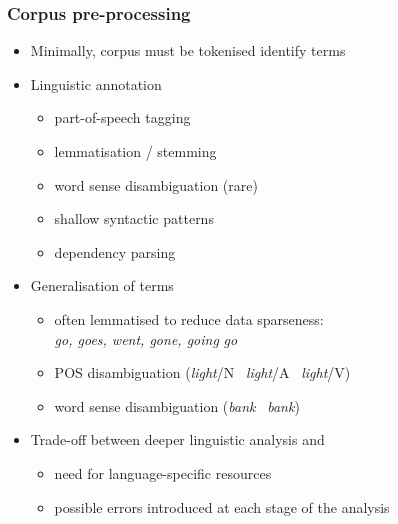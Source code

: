 \begin{frame}
  \frametitle{Corpus pre-processing}

  \ungap
  \begin{itemize}
  \item Minimally, corpus must be tokenised \so identify terms
  \item Linguistic annotation
    \begin{itemize}
    \item part-of-speech tagging
    \item lemmatisation / stemming
    \item word sense disambiguation (rare)
    \item shallow syntactic patterns
    \item dependency parsing
    \end{itemize}
    \pause
  \item Generalisation of terms
    \begin{itemize}
    \item often lemmatised to reduce data sparseness:\\
      \emph{go, goes, went, gone, going} \so \emph{go}
    \item POS disambiguation (\emph{light}/N \vs\ \emph{light}/A \vs\ \emph{light}/V)
    \item word sense disambiguation (\emph{bank} \vs\ \emph{bank})
    \end{itemize}
  \pause
  \item Trade-off between deeper linguistic analysis and
    \begin{itemize}
    \item need for language-specific resources
    \item possible errors introduced at each stage of the analysis
    \end{itemize}
  \end{itemize}
\end{frame}

